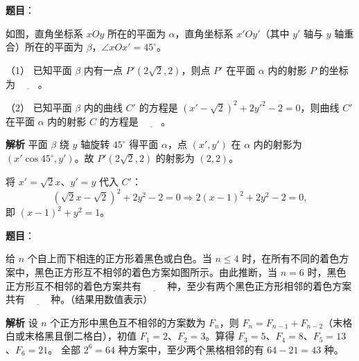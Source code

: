 \begin{answer}

\textbf{题目}：

如图，直角坐标系 $xOy$ 所在的平面为 $\alpha$，直角坐标系 $x'Oy'$（其中 $y'$ 轴与 $y$ 轴重合）所在的平面为 $\beta$，$\angle xOx'=45^\circ$。

（1） 已知平面 $\beta$ 内有一点 $P'\left(2\sqrt2,2\right)$，则点 $P'$ 在平面 $\alpha$ 内的射影 $P$ 的坐标为 $\underline{\qquad}$。

（2） 已知平面 $\beta$ 内的曲线 $C'$ 的方程是 $\left(x'-\sqrt2\right)^2+2y'^2-2=0$，则曲线 $C'$ 在平面 $\alpha$ 内的射影 $C$ 的方程是 $\underline{\qquad}$。
\nopagebreak[4]
\begin{center}\end{center}
\nopagebreak[4]
\textbf{解析}
平面 $\beta$ 绕 $y$ 轴旋转 $45^\circ$ 得平面 $\alpha$，点 $(x',y')$ 在 $\alpha$ 内的射影为 $(x'\cos45^\circ,y')$。故 $P'\left(2\sqrt2,2\right)$ 的射影为 $(2,2)$。

将 $x'=\sqrt2x$、$y'=y$ 代入 $C'$：
\nopagebreak[4]
\[\left(\sqrt2x-\sqrt2\right)^2+2y^2-2=0\Longrightarrow2(x-1)^2+2y^2-2=0,\]
即 $(x-1)^2+y^2=1$。



\end{answer}
\begin{answer}

\textbf{题目}：

给 $n$ 个自上而下相连的正方形着黑色或白色。当 $n\leqslant4$ 时，在所有不同的着色方案中，黑色正方形互不相邻的着色方案如图所示。由此推断，当 $n=6$ 时，黑色正方形互不相邻的着色方案共有 $\underline{\qquad}$ 种，至少有两个黑色正方形相邻的着色方案共有 $\underline{\qquad}$ 种。（结果用数值表示）
\nopagebreak[4]
\begin{center}\end{center}
\nopagebreak[4]
\textbf{解析}
设 $n$ 个正方形中黑色互不相邻的方案数为 $F_n$，则 $F_n=F_{n-1}+F_{n-2}$（末格白或末格黑且倒二格白），初值 $F_1=2$、$F_2=3$。算得 $F_3=5$、$F_4=8$、$F_5=13$、$F_6=21$。
全部 $2^6=64$ 种方案中，至少两个黑格相邻的有 $64-21=43$ 种。


\end{answer}
